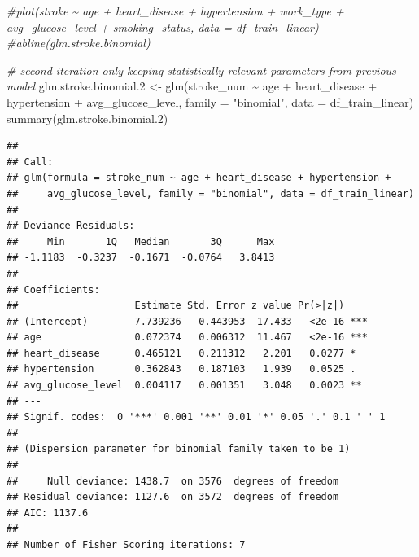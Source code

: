 \documentclass[
]{article}
\newenvironment{Shaded}{\begin{snugshade}}{\end{snugshade}}
\newcommand{\AttributeTok}[1]{\textcolor[rgb]{0.77,0.63,0.00}{#1}}
\newcommand{\CommentTok}[1]{\textcolor[rgb]{0.56,0.35,0.01}{\textit{#1}}}
\newcommand{\FloatTok}[1]{\textcolor[rgb]{0.00,0.00,0.81}{#1}}
\newcommand{\FunctionTok}[1]{\textcolor[rgb]{0.00,0.00,0.00}{#1}}
\newcommand{\NormalTok}[1]{#1}
\newcommand{\OtherTok}[1]{\textcolor[rgb]{0.56,0.35,0.01}{#1}}
\newcommand{\SpecialCharTok}[1]{\textcolor[rgb]{0.00,0.00,0.00}{#1}}
\newcommand{\StringTok}[1]{\textcolor[rgb]{0.31,0.60,0.02}{#1}}
\renewcommand{\=}[1]{\stackrel{#1}{=}}
\theoremstyle{definition}
\theoremstyle{remark}
\begin{document}
\begin{Shaded}
\begin{Highlighting}[]
\CommentTok{\#plot(stroke \textasciitilde{} age + heart\_disease + hypertension + work\_type + avg\_glucose\_level + smoking\_status, data = df\_train\_linear)}
\CommentTok{\#abline(glm.stroke.binomial)}
\end{Highlighting}
\end{Shaded}

\begin{Shaded}
\begin{Highlighting}[]
\CommentTok{\# second iteration only keeping statistically relevant parameters from previous model}
\NormalTok{glm.stroke.binomial}\FloatTok{.2} \OtherTok{\textless{}{-}} \FunctionTok{glm}\NormalTok{(stroke\_num }\SpecialCharTok{\textasciitilde{}}\NormalTok{ age }\SpecialCharTok{+}\NormalTok{ heart\_disease }\SpecialCharTok{+}\NormalTok{ hypertension }\SpecialCharTok{+}\NormalTok{ avg\_glucose\_level,}
\AttributeTok{family =} \StringTok{"binomial"}\NormalTok{,}
\AttributeTok{data =}\NormalTok{ df\_train\_linear)}
\FunctionTok{summary}\NormalTok{(glm.stroke.binomial}\FloatTok{.2}\NormalTok{)}
\end{Highlighting}
\end{Shaded}

\begin{verbatim}
## 
## Call:
## glm(formula = stroke_num ~ age + heart_disease + hypertension + 
##     avg_glucose_level, family = "binomial", data = df_train_linear)
## 
## Deviance Residuals: 
##     Min       1Q   Median       3Q      Max  
## -1.1183  -0.3237  -0.1671  -0.0764   3.8413  
## 
## Coefficients:
##                    Estimate Std. Error z value Pr(>|z|)    
## (Intercept)       -7.739236   0.443953 -17.433   <2e-16 ***
## age                0.072374   0.006312  11.467   <2e-16 ***
## heart_disease      0.465121   0.211312   2.201   0.0277 *  
## hypertension       0.362843   0.187103   1.939   0.0525 .  
## avg_glucose_level  0.004117   0.001351   3.048   0.0023 ** 
## ---
## Signif. codes:  0 '***' 0.001 '**' 0.01 '*' 0.05 '.' 0.1 ' ' 1
## 
## (Dispersion parameter for binomial family taken to be 1)
## 
##     Null deviance: 1438.7  on 3576  degrees of freedom
## Residual deviance: 1127.6  on 3572  degrees of freedom
## AIC: 1137.6
## 
## Number of Fisher Scoring iterations: 7
\end{verbatim}
\end{document}
